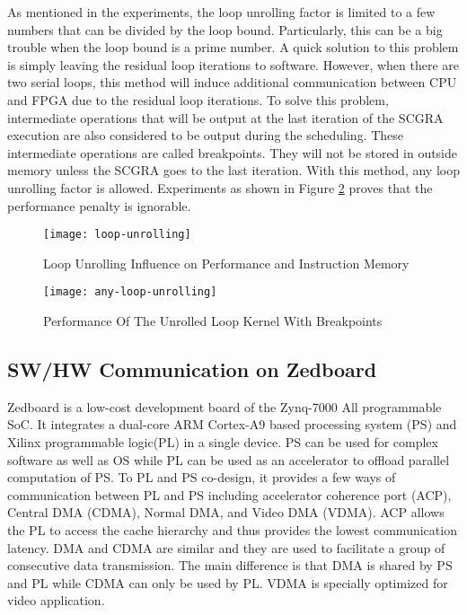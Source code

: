 \documentclass[12pt]{article} %
\begin{document}
As mentioned in the experiments, the loop unrolling factor is limited to a few numbers that can be
divided by the loop bound. Particularly, this can be a big trouble when the loop bound is a prime
number. A quick solution to this problem is simply leaving the residual loop iterations to software.
However, when there are two serial loops, this method will induce additional communication between
CPU and FPGA due to the residual loop iterations. To solve this problem, intermediate operations
that will be output at the last iteration of the SCGRA execution are also considered to be output 
during the scheduling. These intermediate operations are called breakpoints. They will not be stored
in outside memory unless the SCGRA goes to the last iteration. With this method, any loop unrolling
factor is allowed. Experiments as shown in Figure \ref{fig:any-loop-unrolling} proves that the 
performance penalty is ignorable.
\begin{figure}[H]
\centering
\texttt{[image: loop-unrolling]}
\caption{Loop Unrolling Influence on Performance and Instruction Memory}
\label{fig:loop-unrolling}
\end{figure}

\begin{figure}[H]
\centering
\texttt{[image: any-loop-unrolling]}
\caption{Performance Of The Unrolled Loop Kernel With Breakpoints}
\label{fig:any-loop-unrolling}
\end{figure}

\subsection{SW/HW Communication on Zedboard}
Zedboard is a low-cost development board of the Zynq-7000 All programmable SoC. It integrates a
dual-core ARM Cortex-A9 based processing system (PS) and Xilinx programmable logic(PL) in a single
device. PS can be used for complex software as well as OS while PL can be used as an
accelerator to offload parallel computation of PS. To PL and PS co-design, it provides
a few ways of communication between PL and PS including accelerator coherence port (ACP), Central
DMA (CDMA), Normal DMA, and Video DMA (VDMA). ACP allows the PL to access the cache hierarchy and thus provides the
lowest communication latency. DMA and CDMA are similar and they are used to facilitate a group of
consecutive data transmission. The main difference is that DMA is shared by PS and PL while CDMA can only be used by PL.
VDMA is specially optimized for video application.
\end{document}
